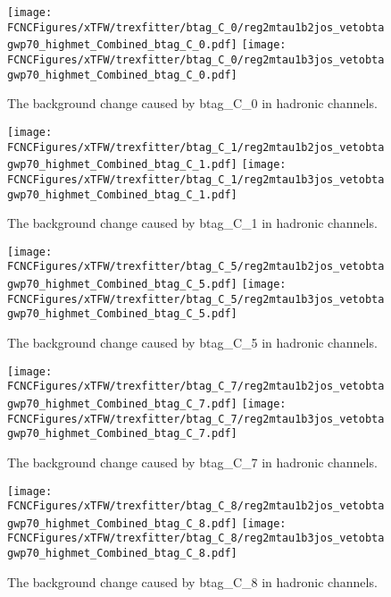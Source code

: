 \begin{figure}[H]
\centering
\texttt{[image: \\FCNCFigures/xTFW/trexfitter/btag\_C\_0/reg2mtau1b2jos\_vetobtagwp70\_highmet\_Combined\_btag\_C\_0.pdf]}
\texttt{[image: \\FCNCFigures/xTFW/trexfitter/btag\_C\_0/reg2mtau1b3jos\_vetobtagwp70\_highmet\_Combined\_btag\_C\_0.pdf]}
\caption{The background change caused by btag\_C\_0 in hadronic channels.}
\label{fig:xTFW_btag_C_0}
\end{figure}

\begin{figure}[H]
\centering
\texttt{[image: \\FCNCFigures/xTFW/trexfitter/btag\_C\_1/reg2mtau1b2jos\_vetobtagwp70\_highmet\_Combined\_btag\_C\_1.pdf]}
\texttt{[image: \\FCNCFigures/xTFW/trexfitter/btag\_C\_1/reg2mtau1b3jos\_vetobtagwp70\_highmet\_Combined\_btag\_C\_1.pdf]}
\caption{The background change caused by btag\_C\_1 in hadronic channels.}
\label{fig:xTFW_btag_C_1}
\end{figure}

\begin{figure}[H]
\centering
\texttt{[image: \\FCNCFigures/xTFW/trexfitter/btag\_C\_5/reg2mtau1b2jos\_vetobtagwp70\_highmet\_Combined\_btag\_C\_5.pdf]}
\texttt{[image: \\FCNCFigures/xTFW/trexfitter/btag\_C\_5/reg2mtau1b3jos\_vetobtagwp70\_highmet\_Combined\_btag\_C\_5.pdf]}
\caption{The background change caused by btag\_C\_5 in hadronic channels.}
\label{fig:xTFW_btag_C_5}
\end{figure}

\begin{figure}[H]
\centering
\texttt{[image: \\FCNCFigures/xTFW/trexfitter/btag\_C\_7/reg2mtau1b2jos\_vetobtagwp70\_highmet\_Combined\_btag\_C\_7.pdf]}
\texttt{[image: \\FCNCFigures/xTFW/trexfitter/btag\_C\_7/reg2mtau1b3jos\_vetobtagwp70\_highmet\_Combined\_btag\_C\_7.pdf]}
\caption{The background change caused by btag\_C\_7 in hadronic channels.}
\label{fig:xTFW_btag_C_7}
\end{figure}

\begin{figure}[H]
\centering
\texttt{[image: \\FCNCFigures/xTFW/trexfitter/btag\_C\_8/reg2mtau1b2jos\_vetobtagwp70\_highmet\_Combined\_btag\_C\_8.pdf]}
\texttt{[image: \\FCNCFigures/xTFW/trexfitter/btag\_C\_8/reg2mtau1b3jos\_vetobtagwp70\_highmet\_Combined\_btag\_C\_8.pdf]}
\caption{The background change caused by btag\_C\_8 in hadronic channels.}
\label{fig:xTFW_btag_C_8}
\end{figure}



